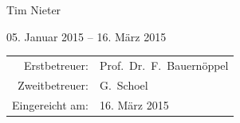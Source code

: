 \begin{titlepage}
\begin{large}
\begin{center}
			\begin{Large}
			Tim Nieter\\
			\end{Large}
			
			\vspace{.5cm}
			
			{05. Januar 2015} -- {16. März 2015}
			
			\vfill
			
			
			\vfill
			
			\begin{tabular}{rl}
			 Erstbetreuer:   & Prof.\ Dr.\ F.\ Bauernöppel\\
			 Zweitbetreuer:   & G.\ Schoel\\
			 Eingereicht am:   & {16. März 2015}
			\end{tabular}
		\end{center}
	\end{large}
\end{titlepage}


%
